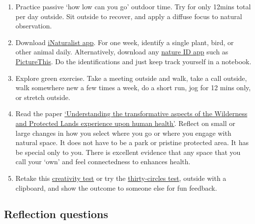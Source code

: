 \documentclass[
]{book}
\providecommand{\tightlist}{%
  \setlength{\itemsep}{0pt}\setlength{\parskip}{0pt}}
\begin{document}
\begin{enumerate}
\def\labelenumi{\arabic{enumi}.}
\tightlist
\item
  Practice passive `how low can you go' outdoor time. Try for only 12mins total per day outside. Sit outside to recover, and apply a diffuse focus to natural observation.\\
\item
  Download \href{https://www.inaturalist.org}{iNaturalist app}. For one week, identify a single plant, bird, or other animal daily. Alternatively, download any \href{https://www.hortibiz.com/newsitem/news/9-best-plant-identification-app-choices-of-2020/}{nature ID app} such as \href{https://www.picturethisai.com}{PictureThis}. Do the identifications and just keep track yourself in a notebook.\\
\item
  Explore green exercise. Take a meeting outside and walk, take a call outside, walk somewhere new a few times a week, do a short run, jog for 12 mins only, or stretch outside.
\item
  Read the paper \href{https://www.fs.usda.gov/treesearch/pubs/38787}{`Understanding the transformative aspects of the Wilderness and Protected Lands experience upon human health'}. Reflect on small or large changes in how you select where you go or where you engage with natural space. It does not have to be a park or pristine protected area. It has be special only to you. There is excellent evidence that any space that you call your `own' and feel connectedness to enhances health.\\
\item
  Retake this \href{http://www.testmycreativity.com}{creativity test} or try the \href{https://www.ideo.com/blog/build-your-creative-confidence-thirty-circles-exercise}{thirty-circles test}, outside with a clipboard, and show the outcome to someone else for fun feedback.
\end{enumerate}

\hypertarget{reflection-questions-2}{%
\subsection*{Reflection questions}\label{reflection-questions-2}}
\end{document}
